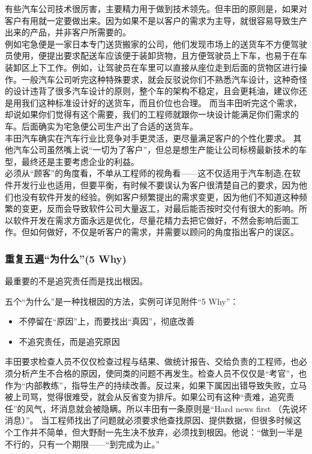 有些汽车公司技术很厉害，主要精力用于做到技术领先。但丰田的原则是，如果对客户有用就一定要做出来。因为如果不是以客户的需求为主导，就很容易导致生产出来的产品，并非客户所需要的。\\
例如宅急便是一家日本专门送货搬家的公司，他们发现市场上的送货车不方便驾驶员使用，便提出要求配送车应该便于装卸货物，且方便驾驶员上下车，也易于在车装卸区上下工作。例如，让驾驶员在车里可以直接从座位走到后面的货物区进行操作。一般汽车公司听完这种特殊要求，就会反驳说你们不熟悉汽车设计，这种奇怪的设计违背了很多汽车设计的原则，整个车的架构不稳定，且会更耗油，建议你还是用我们这种标准设计好的送货车，而且价位也合理。
而当丰田听完这个需求，却说如果你们觉得有这个需要，我们的工程师就跟你一块设计能满足你们需求的车。后面确实为宅急便公司生产出了合适的送货车。\\
丰田汽车确实在汽车行业比竞争对手更灵活，更尽量满足客户的个性化要求。
其他汽车公司虽然嘴上说``一切为了客户''，但总是想生产能让公司标榜最新技术的车型，最终还是主要考虑企业的利益。\\
必须从``顾客''的角度看，不单从工程师的视角看------这不仅适用于汽车制造,在软件开发行业也适用，但要平衡，有时候不要误认为客户很清楚自己的要求，因为他们也没有软件开发的经验。例如客户频繁提出的需求变更，因为他们不知道这种频繁的变更，反而会导致软件公司大量返工，对最后能否按时交付有很大的影响。所以软件开发在需求方面永远是优化，尽量花精力去把它做好，不然会影响后面工作。但如何做好，不仅是听客户的需求，并需要以顾问的角度指出客户的误区。

\hypertarget{ux91cdux590dux4e94ux904dux4e3aux4ec0ux4e485-why}{%
\subsubsection{重复五遍``为什么''(5
Why)}\label{ux91cdux590dux4e94ux904dux4e3aux4ec0ux4e485-why}}

最重要的不是追究责任而是找出根因。

五个``为什么''是一种找根因的方法，实例可详见附件``5 Why''：

\begin{itemize}
\tightlist
\item
  不停留在``原因''上，而要找出``真因''，彻底改善
\item
  不追究责任，而是追究原因
\end{itemize}

丰田要求检查人员不仅仅检查过程与结果、做统计报告、交给负责的工程师，也必须分析产生不合格的原因，使同类的问题不再发生。检查人员不仅仅是``考官''，也作为``内部教练''，指导生产的持续改善。反过来，如果下属因出错导致失败，立马被上司骂，觉得很难受，就会从反省变为排斥。如果公司有这种``责难，追究责任''的风气，坏消息就会被隐瞒。所以丰田有一条原则是``Hard
news first （先说坏消息）''。
当工程师找出了问题就必须要求他查找原因、提供数据，但很多时候这个工作并不简单，但大野耐一先生决不放弃，必须找到根因。他说：``做到一半是不行的，只有一个期限------``到完成为止。''

